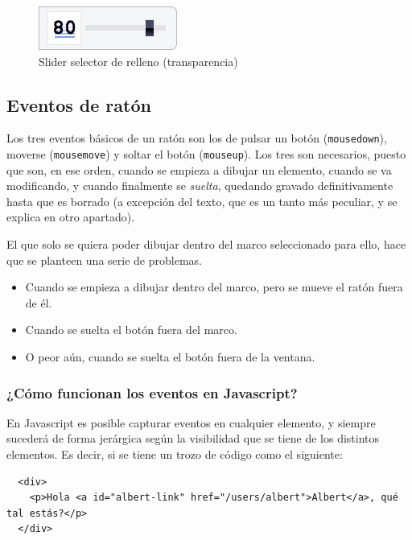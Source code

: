 \begin{figure}[h!]
\centering
\includegraphics{fill_selector.png}
\caption{Slider selector de relleno (transparencia)}\label{fig:fill_selector}
\end{figure}




\subsection{Eventos de ratón} %
\label{sub:eventos_de_raton}

Los tres eventos básicos de un ratón son los de pulsar un botón (\texttt{mousedown}), moverse (\texttt{mousemove}) y soltar el botón (\texttt{mouseup}). Los tres son necesarios, puesto que son, en ese orden, cuando se empieza a dibujar un elemento, cuando se va modificando, y cuando finalmente se \emph{suelta}, quedando gravado definitivamente hasta que es borrado (a excepción del texto, que es un tanto más peculiar, y se explica en otro apartado).

El que solo se quiera poder dibujar dentro del marco seleccionado para ello, hace que se planteen una serie de problemas.

\begin{itemize}
  \item Cuando se empieza a dibujar dentro del marco, pero se mueve el ratón fuera de él.
  \item Cuando se suelta el botón fuera del marco.
  \item O peor aún, cuando se suelta el botón fuera de la ventana.
\end{itemize}

\subsubsection{¿Cómo funcionan los eventos en Javascript?} %
\label{ssub:como_funcionan_los_eventos}

En Javascript es posible capturar eventos en cualquier elemento, y siempre sucederá de forma jerárgica según la visibilidad que se tiene de los distintos elementos. Es decir, si se tiene un trozo de código como el siguiente:
\begin{verbatim}
  <div>
    <p>Hola <a id="albert-link" href="/users/albert">Albert</a>, qué tal estás?</p>
  </div>
\end{verbatim}

